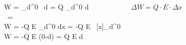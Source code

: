 \begin{frame}
{\begin{columns}
\begin{columns}
	\begin{figure}[h!]
		\centering
		

	\end{figure}


		
		\end{columns}		

		\pause





		\begin{eqa}
			W = \int_{d}^{0}   \, d  =  Q \int_{d}^{0}  \cdot d \\
			 \,  = \\
			 W = -Q \cdot E \int_{d}^{0} dx = -Q \cdot E \, [x]_d^0 \\
			 W = -Q \cdot E (0-d) = Q \cdot E \cdot d
		\end{eqa}


		\begin{Merksatz}{}
			$\Delta W = Q \cdot E \cdot \Delta x$
		\end{Merksatz}

			
	
		



	


	





\end{columns}}
\end{frame}
